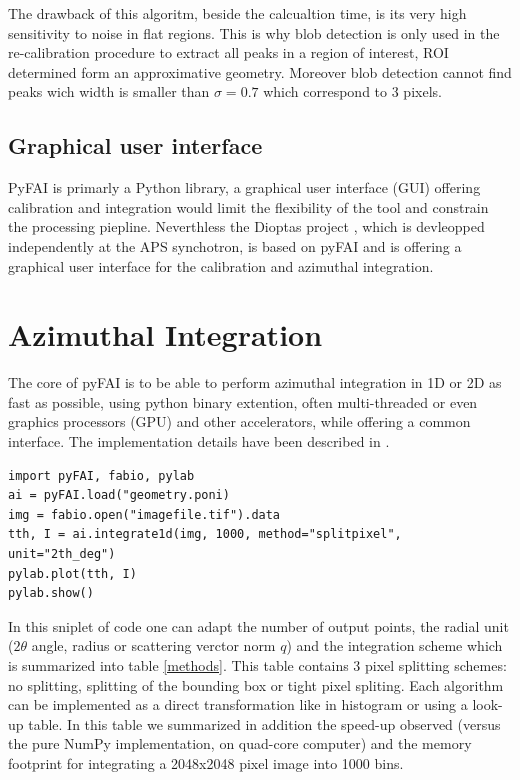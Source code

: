 \documentclass[preprint]{iucr}
\begin{document}
The drawback of this algoritm, beside the calcualtion time, is its very high
sensitivity to noise in flat regions. 
This is why blob detection is only used in the re-calibration procedure to
extract all peaks in a region of interest, ROI determined form an
approximative geometry.
Moreover blob detection cannot find peaks wich width is smaller than  
$\sigma=0.7$ which correspond to 3 pixels.


\subsection{Graphical user interface}
PyFAI is primarly a Python library, a graphical user interface (GUI) offering
calibration and integration would limit the flexibility of the tool and
constrain the processing piepline. 
Neverthless the Dioptas project 
\cite{diopas}, which is devleopped independently at the APS synchotron, is based
on pyFAI and is offering a graphical user interface for the calibration and
azimuthal integration.

\section{Azimuthal Integration}

The core of pyFAI is to be able to perform azimuthal integration in 1D or 2D as
fast as possible, using python binary extention, often multi-threaded or even
graphics processors (GPU) and other accelerators, while offering a common
interface. 
The implementation details have been described in
\cite{kieffer_ashiotis-proc-euroscipy-2014}.

\begin{verbatim}
import pyFAI, fabio, pylab
ai = pyFAI.load("geometry.poni)
img = fabio.open("imagefile.tif").data
tth, I = ai.integrate1d(img, 1000, method="splitpixel", unit="2th_deg")
pylab.plot(tth, I)
pylab.show()
\end{verbatim}
In this sniplet of code one can adapt the number of output points, 
the radial unit ($2\theta$ angle, radius or scattering verctor norm $q$) and the
integration scheme which is summarized into table \ref{methods}.
This table contains 3 pixel splitting schemes: no splitting, splitting of the
bounding box or tight pixel spliting. Each algorithm can be implemented as a
direct transformation like in histogram or using a look-up table.
In this table we summarized in addition the speed-up observed (versus the pure
NumPy \cite{numpy} implementation, on  quad-core computer) and the memory
footprint for integrating a 2048x2048 pixel image into 1000 bins.
\end{document}
